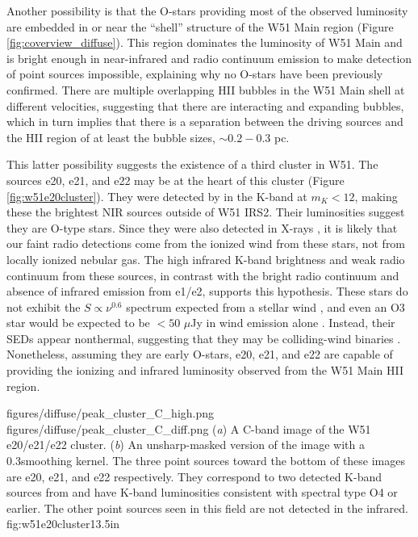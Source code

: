 Another possibility is that the O-stars providing most of the observed
luminosity are embedded in or near the ``shell'' structure of the W51 Main
region (Figure \ref{fig:coverview_diffuse}).  This region dominates the
luminosity of W51 Main and is bright enough in near-infrared and radio
continuum emission to make detection of point sources impossible, explaining
why no O-stars have been previously confirmed.  There are multiple overlapping
HII bubbles in the W51 Main shell at different velocities, suggesting that
there are interacting and  expanding bubbles, which in turn implies that there
is a separation between the driving sources and the HII region of at least the
bubble sizes, $\sim0.2-0.3$ pc.  

This latter possibility suggests the existence of a third cluster in W51.  The
sources e20, e21, and e22 may be at the heart of this cluster (Figure
\ref{fig:w51e20cluster}).  They
were detected by \citet{Goldader1994a} in the K-band at $m_K < 12$, making
these the brightest NIR sources outside of W51 IRS2.  Their luminosities
suggest they are O-type stars.  Since they were also detected
in X-rays \citep{Townsley2014a}, it is likely that our faint radio detections
come from the ionized wind from these stars, not from locally ionized nebular gas.
The high infrared K-band brightness and weak radio continuum from these sources,
in contrast with the bright radio continuum and absence of infrared emission
from e1/e2, supports this hypothesis.  These stars do not exhibit
the $S\propto \nu^{0.6}$ spectrum expected from a stellar wind
\citep{Wright1975a,Panagia1975b,Reynolds1986a}, and even an O3 star would be expected
to be $<50$ $\mu$Jy in wind emission alone \citep{Dzib2013d}.  Instead, their SEDs appear nonthermal,
suggesting that they may be colliding-wind binaries \citep{Dzib2013d...}.
Nonetheless, assuming they are early O-stars, e20, e21, and e22 are capable of
providing the ionizing and infrared luminosity observed from the W51 Main HII
region.

\FigureTwo
{figures/diffuse/peak_cluster_C_high.png}
{figures/diffuse/peak_cluster_C_diff.png}
{({\it a}) A C-band image of the W51 e20/e21/e22 cluster.
({\it b}) An unsharp-masked version of the image with a 0.3\arcsec smoothing
kernel. 
The three point sources toward the bottom of these images are e20, e21, and e22
respectively.  They correspond to two detected K-band sources from
\citet{Goldader1994a} and have K-band luminosities consistent with spectral
type O4 or earlier.  The other point sources seen in this field are not detected
in the infrared.
}
{fig:w51e20cluster}{1}{3.5in}


